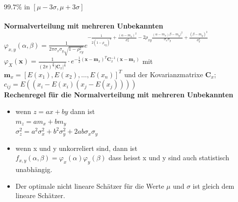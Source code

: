 		$99.7\% $ in $[ \mu - 3\sigma, \mu + 3\sigma]$\\\\
		\textbf{ Normalverteilung mit mehreren Unbekannten}\\
		$\varphi_{x,y}(\alpha,\beta)=\frac{1}{2\pi \sigma_x \sigma_y \sqrt{1-\rho_{xy}^2}}
			e^{-\frac{1}{2(1-\rho_{xy})^2} + \frac{(\alpha - m_x)^2}{\sigma_x^2} 
			- 2\rho_{xy}\frac{(\alpha - m_x)\beta - m_y)^2}{\sigma_x \sigma_y} + \frac{(\beta - m_y)^2}{\sigma_y^2}}$\\
			$\varphi_X(\textbf{x})=\frac{1}{(2\pi)^{\frac{n}{2}}|\textbf{C}_x|^{\frac{1}{2}}}\cdot 
			e^{-\frac{1}{2}(\textbf{x} - \textbf{m}_x)^T \textbf{C}_x^{-1} (\textbf{x} - \textbf{m}_x)}$ mit \\
			$\textbf{m}_x=[E(x_1), E(x_2), \ldots, E(x_n)]^T$ und der Kovarianzmatrixe $\textbf{C}_x$; $c_{ij} = E((x_i-E(x_i)(x_j-E(x_j))))$ \\
		\textbf{Rechenregel für die Normalverteilung mit mehreren Unbekannten}
		\begin{itemize}
		  \item wenn $z=a x + b y$ dann ist \\
		  $m_z =  a m_x + b m_y$\\
		  $\sigma_z^2 = a^2\sigma_x^2 + b^2\sigma_y^2+2ab\sigma_x\sigma_y$
		  \item wenn x und y unkorreliert sind, dann ist \\
		  		$f_{x,y}(\alpha, \beta) = \varphi_x(\alpha)\varphi_y(\beta)$ dass heisst x und y sind auch statistisch unabhängig.
		  \item Der optimale nicht lineare Schätzer für die Werte $\mu$ und $\sigma$ ist gleich dem lineare Schätzer.
		\end{itemize}
   		
 
        
        
        
